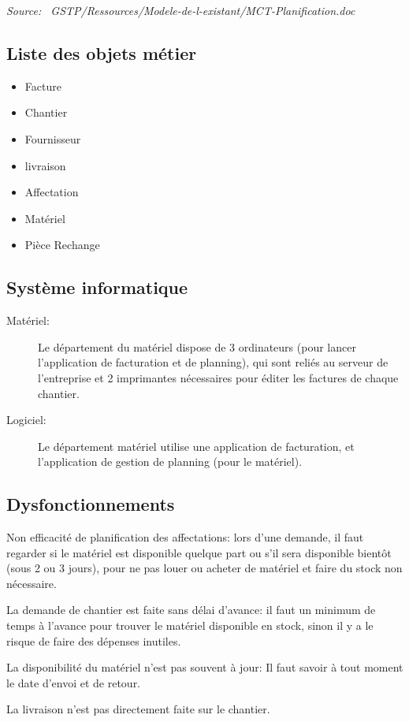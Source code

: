     {\sl Source:~{\ttfamily 
        GSTP/Ressources/Modele-de-l-existant/MCT-Planification.doc}}


\subsection{Liste des objets métier}

    \begin{itemize}
    	\item Facture
    	\item Chantier
    	\item Fournisseur
    	\item livraison
    	\item Affectation
    	\item Matériel
    	\item Pièce Rechange
    \end{itemize}

\subsection{Système informatique}

    \begin{description}
        \item [Matériel:]\el 
            Le département du matériel dispose de 3 ordinateurs (pour lancer
            l'application de facturation et de planning), qui sont reliés au
            serveur de l'entreprise et 2 imprimantes nécessaires pour
            éditer les factures de chaque chantier.

        \item [Logiciel:]\el
            Le département matériel utilise une application de facturation,
            et l'application de gestion de planning (pour le matériel).
    \end{description}

\subsection{Dysfonctionnements}

    Non efficacité de planification des affectations: lors d'une demande,
    il faut regarder si le matériel est disponible quelque part ou s'il sera
    disponible bientôt (sous 2 ou 3 jours), pour ne pas louer ou acheter de
    matériel et faire du stock non nécessaire.

    La demande de chantier est faite sans délai d'avance: il faut un minimum
    de temps à l'avance pour trouver le matériel disponible en stock, sinon
    il y a le risque de faire des dépenses inutiles.

    La disponibilité du matériel n'est pas souvent à jour: Il faut savoir à
    tout moment le date d'envoi et de retour.

    La livraison n'est pas directement faite sur le chantier.

\vfil
\pagebreak

